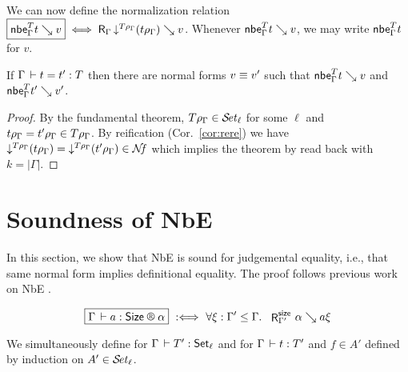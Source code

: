 \documentclass[acmlarge,review,anonymous]{acmart}\settopmatter{printfolios=true}
\begin{document}
We can now define the normalization relation
$\fbox{$\nbe \Gamma T t \evalsto v$} \iff \R {\Gamma} {\down{T \rho_\Gamma} (t \rho_\Gamma)} v$.
Whenever $\nbe \Gamma T t \evalsto v$, we may write $\nbe \Gamma T t$ for $v$.

\begin{theorem}
  If\/ $\Gamma \der t = t' : T$ then there are normal forms $v \nfeq v'$ such that
  $\nbe \Gamma T t \evalsto v$ and $\nbe \Gamma T {t'} \evalsto v'$.
\end{theorem}
\begin{proof}
  By the fundamental theorem, $T \rho_\Gamma \in \SET[\ell]$ for some $\ell$ and
  $t \rhog = t' \rhog \in T\rhog$.  By reification (Cor.~\ref{cor:rere}) we have
  $\down{T\rhog} (t\rhog) = \down{T\rhog}(t'\rhog) \in \NF$ which implies the theorem
  by read back with $k = |\Gamma|$.
\end{proof}



\section{Soundness  of NbE}
\label{sec:compl}

In this section, we show that NbE is sound for judgemental equality, i.e., that same normal form implies definitional equality.  The proof follows previous work on NbE \cite{abelCoquandDybjer:lics07,abel:habil}.

\[
  \fbox{$\LRSize \Gamma a \alpha$} \defas
  \forall \xi : \Gamma' \leq \Gamma.\ \
  \RSize {\Gamma'} \alpha {a\xi}
\]

We simultaneously define
 for $\Gamma \der T' : \Set[\ell]$
and \fbox{$\LR \Gamma t {T'} f {A'}$} for $\Gamma \der t : T'$ and $f \in A'$
defined by induction on ${A'} \in \SET[\ell]$.
\end{document}

